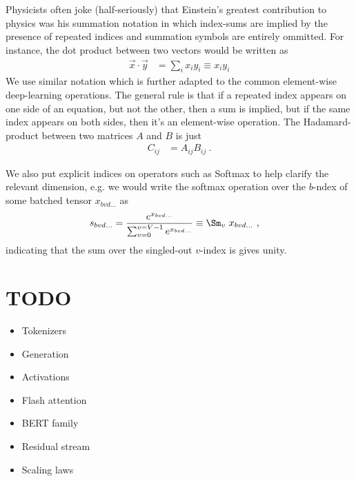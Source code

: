 \documentclass[11pt]{article}
\begin{document}
Physicists often joke (half-seriously) that Einstein's greatest contribution to physics was his
summation notation in which index-sums are implied by the presence of repeated indices and summation
symbols are entirely ommitted. For instance, the dot product between two vectors would be written as
\begin{align}
    \vec{x} \cdot \vec{y} &= \sum _{ i } x _{ i } y _{ i } \equiv x _{ i } y _{  i }
    \label{app_eq_einstein_sum}
\end{align}
We use similar notation which is further adapted to the common element-wise deep-learning
operations.  The general rule is that if a repeated index appears on one side of an equation, but
not the other, then a sum is implied, but if the same index appears on both sides, then it's an
element-wise operation. The Hadamard-product between two matrices $ A $ and $ B $ is just
\begin{align}
  C _{ ij } &= A _{ ij } B _{ ij }\ .
\end{align}

 We also put explicit indices on operators such as Softmax to help clarify the relevant
 dimension, e.g. we would write the softmax operation over the $ b $-ndex of some batched
 tensor $ x _{ bvd\ldots } $ as
 \begin{align}
     s _{ bvd\ldots } &= \frac{ e^{ x _{ bv d\ldots}  } }{ \sum _{ v = 0 } ^{  v= V-1 } e^{ x _{
     bvd\ldots } } } \equiv
     \Sm _{ v } \ x _{ bvd\ldots }
     \ , \label{app_eq_einstein_softmax}
 \end{align}
 indicating that the sum over the singled-out $ v $-index is gives unity.



 \section{TODO}


 \begin{itemize}
 \item Tokenizers
 \item Generation
 \item Activations
 \item Flash attention
 \item BERT family
 \item Residual stream
 \item Scaling laws
 \end{itemize}



\end{document}
